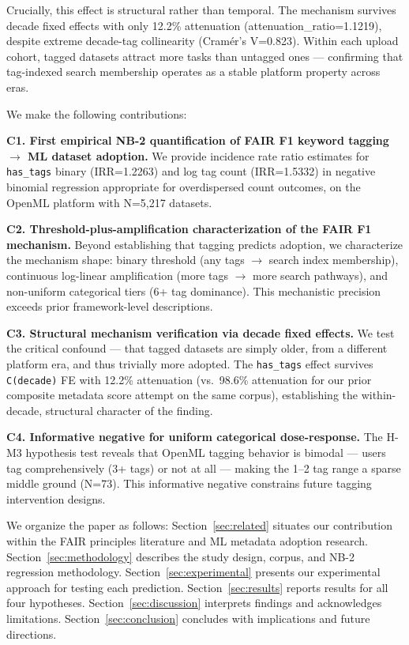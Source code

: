 Crucially, this effect is structural rather than temporal. The mechanism survives decade fixed effects with only 12.2\% attenuation (attenuation\_ratio=1.1219), despite extreme decade-tag collinearity (Cram\'er's V=0.823). Within each upload cohort, tagged datasets attract more tasks than untagged ones --- confirming that tag-indexed search membership operates as a stable platform property across eras.

We make the following contributions:

\textbf{C1. First empirical NB-2 quantification of FAIR F1 keyword tagging $\rightarrow$ ML dataset adoption.} We provide incidence rate ratio estimates for \texttt{has\_tags} binary (IRR=1.2263) and log tag count (IRR=1.5332) in negative binomial regression appropriate for overdispersed count outcomes, on the OpenML platform with N=5,217 datasets.

\textbf{C2. Threshold-plus-amplification characterization of the FAIR F1 mechanism.} Beyond establishing that tagging predicts adoption, we characterize the mechanism shape: binary threshold (any tags $\rightarrow$ search index membership), continuous log-linear amplification (more tags $\rightarrow$ more search pathways), and non-uniform categorical tiers (6+ tag dominance). This mechanistic precision exceeds prior framework-level descriptions.

\textbf{C3. Structural mechanism verification via decade fixed effects.} We test the critical confound --- that tagged datasets are simply older, from a different platform era, and thus trivially more adopted. The \texttt{has\_tags} effect survives \texttt{C(decade)} FE with 12.2\% attenuation (vs.\ 98.6\% attenuation for our prior composite metadata score attempt on the same corpus), establishing the within-decade, structural character of the finding.

\textbf{C4. Informative negative for uniform categorical dose-response.} The H-M3 hypothesis test reveals that OpenML tagging behavior is bimodal --- users tag comprehensively (3+ tags) or not at all --- making the 1--2 tag range a sparse middle ground (N=73). This informative negative constrains future tagging intervention designs.

We organize the paper as follows: Section~\ref{sec:related} situates our contribution within the FAIR principles literature and ML metadata adoption research. Section~\ref{sec:methodology} describes the study design, corpus, and NB-2 regression methodology. Section~\ref{sec:experimental} presents our experimental approach for testing each prediction. Section~\ref{sec:results} reports results for all four hypotheses. Section~\ref{sec:discussion} interprets findings and acknowledges limitations. Section~\ref{sec:conclusion} concludes with implications and future directions.
